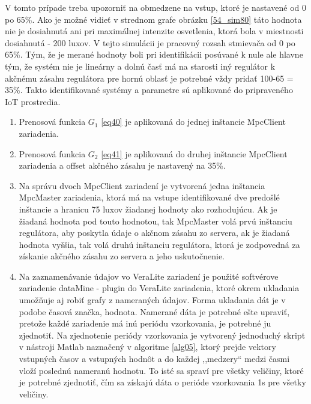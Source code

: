 V tomto prípade treba upozorniť na obmedzene na vstup, ktoré je nastavené od 0 po 65\%. Ako je možné vidieť v strednom grafe obrázku \ref{54_sim80} táto hodnota nie je dosiahnutá ani pri maximálnej intenzite osvetlenia, ktorá bola v miestnosti dosiahnutá - 200 luxov. V tejto simulácii je pracovný rozsah stmievača od 0 po 65\%. Tým, že je merané hodnoty boli pri identifikácii posúvané k nule ale hlavne tým, že systém nie je lineárny a dolnú časť má na starosti iný regulátor k akčnému zásahu regulátora pre hornú oblasť je potrebné vždy pridať 100-65 = 35\%.
Takto identifikované systémy a parametre sú aplikované do pripraveného IoT prostredia. 
\begin{enumerate}
\item Prenosová funkcia $G_1$ \ref{eq40} je aplikovaná do jednej inštancie MpcClient zariadenia. 
\item Prenosová funkcia $G_2$ \ref{eq41} je aplikovaná do druhej inštancie MpcClient zariadenia a offset akčného zásahu je nastavený na 35\%.
\item Na správu dvoch MpcClient zariadení je vytvorená jedna inštancia MpcMaster zariadenia, ktorá má na vstupe identifikované dve predošlé inštancie a hranicu 75 luxov žiadanej hodnoty ako rozhodujúcu. Ak je žiadaná hodnota pod touto hodnotou, tak MpcMaster volá prvú inštanciu regulátora, aby poskytla údaje o akčnom zásahu zo servera, ak je žiadaná hodnota vyššia, tak volá druhú inštanciu regulátora, ktorá je zodpovedná za získanie akčného zásahu zo servera a jeho uskutočnenie. 
\item Na zaznamenávanie údajov vo VeraLite zariadení je použité softvérove zariadenie dataMine \cite{IOT31} - plugin do VeraLite zariadenia, ktoré okrem ukladania umožňuje aj robiť grafy z nameraných údajov. Forma ukladania dát je v podobe časová značka, hodnota. Namerané dáta je potrebné ešte upraviť, pretože každé zariadenie má inú periódu vzorkovania, je potrebné ju zjednotiť. Na zjednotenie periódy vzorkovania je vytvorený jednoduchý skript v nástroji Matlab naznačený v algoritme  \ref{alg05}, ktorý prejde vektory vstupných časov a vstupných hodnôt a do každej ,,medzery`` medzi časmi vloží poslednú nameranú hodnotu. To isté sa spraví pre všetky veličiny, ktoré je potrebné zjednotiť, čím sa získajú dáta o perióde vzorkovania 1s pre všetky veličiny.
\end{enumerate}

